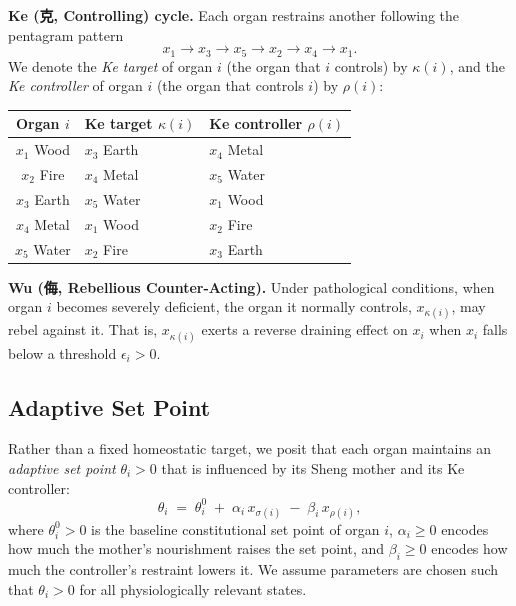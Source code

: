 \documentclass{article}
\begin{document}
\medskip
\noindent\textbf{Ke (克, Controlling) cycle.}
Each organ restrains another following the pentagram pattern
\[
x_1 \to x_3 \to x_5 \to x_2 \to x_4 \to x_1.
\]
We denote the \emph{Ke target} of organ $i$ (the organ that $i$ controls) by
$\kappa(i)$, and the \emph{Ke controller} of organ $i$ (the organ that controls $i$)
by $\rho(i)$:

\begin{center}
\begin{tabular}{cll}
\toprule
Organ $i$ & Ke target $\kappa(i)$ & Ke controller $\rho(i)$ \\
\midrule
$x_1$ Wood  & $x_3$ Earth  & $x_4$ Metal  \\
$x_2$ Fire  & $x_4$ Metal  & $x_5$ Water  \\
$x_3$ Earth & $x_5$ Water  & $x_1$ Wood   \\
$x_4$ Metal & $x_1$ Wood   & $x_2$ Fire   \\
$x_5$ Water & $x_2$ Fire   & $x_3$ Earth  \\
\bottomrule
\end{tabular}
\end{center}

\medskip
\noindent\textbf{Wu (侮, Rebellious Counter-Acting).}
Under pathological conditions, when organ $i$ becomes severely deficient, the organ
it normally controls, $x_{\kappa(i)}$, may rebel against it. That is, $x_{\kappa(i)}$
exerts a reverse draining effect on $x_i$ when $x_i$ falls below a threshold
$\epsilon_i > 0$.

\subsection{Adaptive Set Point}

Rather than a fixed homeostatic target, we posit that each organ maintains an
\emph{adaptive set point} $\theta_i > 0$ that is influenced by its Sheng mother
and its Ke controller:
\begin{equation}\label{eq:setpoint}
    \theta_i \;=\; \theta_i^0 \;+\; \alpha_i\, x_{\sigma(i)} \;-\; \beta_i\, x_{\rho(i)},
\end{equation}
where $\theta_i^0 > 0$ is the baseline constitutional set point of organ $i$,
$\alpha_i \geq 0$ encodes how much the mother's nourishment raises the set point,
and $\beta_i \geq 0$ encodes how much the controller's restraint lowers it.
We assume parameters are chosen such that $\theta_i > 0$ for all physiologically
relevant states.
\end{document}
